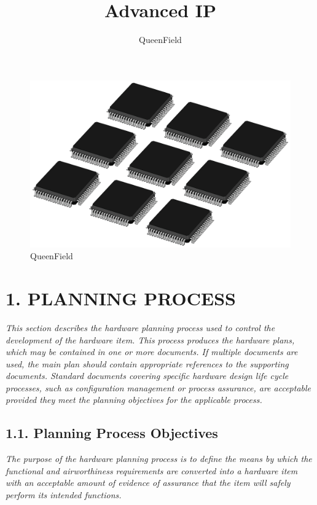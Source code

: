 \documentclass[
]{article}
\title{Advanced IP}
\author{QueenField}
\date{}
\begin{document}
\maketitle

\begin{figure}
\centering
\includegraphics{../icon.jpg}
\caption{QueenField}
\end{figure}

\hypertarget{planning-process}{%
\section{1. PLANNING PROCESS}\label{planning-process}}

\emph{This section describes the hardware planning process used to
control the development of the hardware item. This process produces the
hardware plans, which may be contained in one or more documents. If
multiple documents are used, the main plan should contain appropriate
references to the supporting documents. Standard documents covering
specific hardware design life cycle processes, such as configuration
management or process assurance, are acceptable provided they meet the
planning objectives for the applicable process.}

\hypertarget{planning-process-objectives}{%
\subsection{1.1. Planning Process
Objectives}\label{planning-process-objectives}}

\emph{The purpose of the hardware planning process is to define the
means by which the functional and airworthiness requirements are
converted into a hardware item with an acceptable amount of evidence of
assurance that the item will safely perform its intended functions.}
\end{document}
